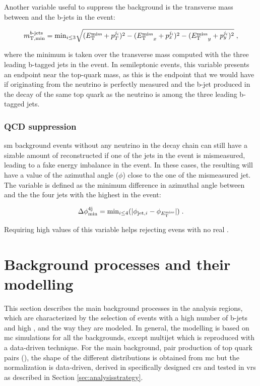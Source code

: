 Another variable useful to suppress the \ttbar background is the transverse mass between \met and the b-jets in the event:

\begin{equation}
m_{\mathrm{T, min}}^{b\textrm{-jets}} =  \mathrm{min}_{i\leq 3}  \sqrt{(E_{\rm T}^{\mathrm{miss}}+p_T^{j_i})^2 - ({E_{\rm T}^{\mathrm{miss}}}_x+p_x^{j_i})^2 - ({E_{\rm T}^{\mathrm{miss}}}_y+p_y^{j_i})^2 } \; ,
\end{equation}

\noindent where the minimum is taken over the transverse mass computed with the three leading b-tagged jets in the event. 
In semileptonic \ttbar events, this variable presents an endpoint near the top-quark mass, as this is the endpoint that we would have if \met originating from the neutrino is perfectly measured and the b-jet produced in the decay of the same top quark as the neutrino is among the three leading b-tagged jets. 


\subsubsection*{QCD suppression}

\gls{sm} background events without any neutrino in the decay chain can still have a sizable amount of reconstructed \met if one of the jets in the 
event is mismeasured, leading to a fake energy imbalance in the event. In these cases, the resulting \met will have a value of the azimuthal angle ($\phi$) close to the one of the mismeasured jet. The variable \dphimin is defined as the minimum difference in azimuthal angle between \met and the the four jets with the highest \pt in the event:

\begin{equation}
\Delta\phi_{\rm{min}}^{4{\rm{j}}} = \textrm{min}_{i \leq 4}(|\phi_{{\rm{jet},}i} - \phi_{E_{\rm T}^{\mathrm{miss}}}|) \; .
\end{equation}

\noindent Requiring high values of this variable helps rejecting evens with no real \met. 


\section{Background processes and their modelling}
\label{sec:common_backgrounds}

This section describes the main background processes in the analysis regions, 
which are characterized by the selection of events with a high number of b-jets and high \met, and the way they are modeled. 
In general, the modelling is based on \gls{mc} simulations for
all the backgrounds, except multijet which is reproduced with a data-driven technique.
For the main background, pair production of top quark pairs (\ttbar), the shape of the different distributions is obtained from \gls{mc}
but the normalization is data-driven, derived in specifically designed \glspl{cr} and tested in \glspl{vr} as described in Section \ref{sec:analysisstrategy}.


